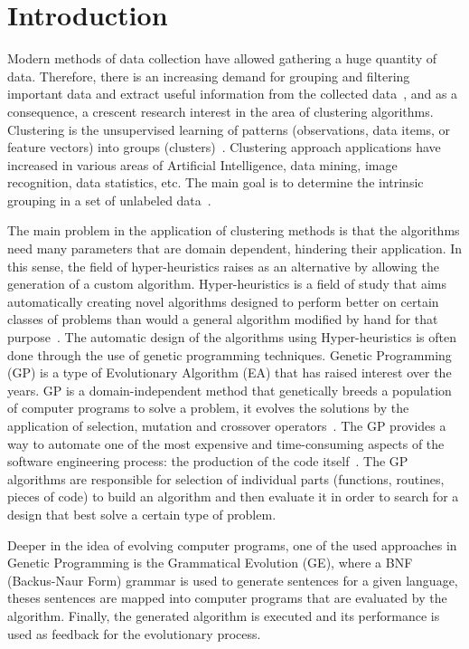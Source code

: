 \documentclass[conference,compsoc]{IEEEtran}
\begin{document}
\section{Introduction}

Modern methods of data collection have allowed gathering a huge quantity of data. Therefore, there is an increasing demand for grouping and filtering important data and extract useful information from the collected data~\cite{ahalya2015data}, and as a consequence, a crescent research interest in the area of clustering algorithms. Clustering is the unsupervised learning of patterns (observations, data items, or feature vectors) into groups (clusters)~\cite{jain1988algorithms}. Clustering approach applications have increased in various areas of Artificial Intelligence, data mining, image recognition, data statistics, etc. The main goal is to determine the intrinsic grouping in a set of unlabeled data~\cite{ahalya2015data}.

The main problem in the application of clustering methods is that the algorithms need many parameters that are domain dependent, hindering their application. In this sense, the field of hyper-heuristics raises as an alternative by allowing the generation of a custom algorithm. Hyper-heuristics is a field of study that aims automatically creating novel algorithms designed to perform better on certain classes of problems than would a general algorithm modified by hand for that purpose~\cite{harris2015comparison}. The automatic design of the algorithms using Hyper-heuristics is  often done through the use of genetic programming techniques. Genetic Programming (GP) is a type of Evolutionary Algorithm (EA) that has raised interest over the years. GP is a domain-independent method that genetically breeds a population of computer programs to solve a problem, it evolves the solutions by the application of selection, mutation and crossover operators~\cite{poli2014genetic}. The GP provides a way to automate one of the most expensive and time-consuming aspects of the software engineering process: the production of the code itself~\cite{langdon2013optimising}. The GP algorithms are responsible for selection of individual parts (functions, routines, pieces of code) to build an algorithm and then evaluate it in order to search for a design that best solve a certain type of problem.

Deeper in the idea of evolving computer programs, one of the used approaches in Genetic Programming is the Grammatical Evolution (GE), where a BNF (Backus-Naur Form) grammar is used to generate sentences for a given language, theses sentences are mapped into  computer programs that are evaluated by the algorithm. Finally, the generated algorithm is executed and its performance is used as feedback for the evolutionary process.
\end{document}
